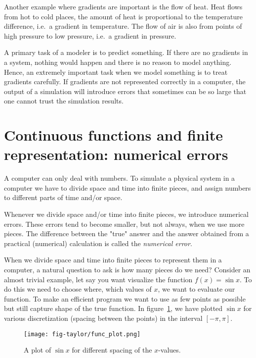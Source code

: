 \documentclass[graybox,sectrefs,envcountresetchap,open=right,final]{svmonodo}
\newenvironment{graybox2admon}[1][]{
\begin{graybox2mdframed}[frametitle=#1]
}
{
\end{graybox2mdframed}
}
\begin{document}
Another example where gradients are important is the flow of heat. Heat flows from hot to cold places, the amount of heat is proportional to the temperature difference, i.e.~a gradient in temperature. The flow of air is also from points of high pressure to low pressure, i.e.~a gradient in pressure. 

A primary task of a modeler is to predict something. If there are no gradients in a system, nothing would happen and there is no reason to model anything. Hence, an extremely important task when we model something is to treat gradients carefully. If gradients are not represented correctly in a computer, the output of a simulation will introduce errors that sometimes can be so large that one cannot trust the simulation results.

\section{Continuous functions and finite representation: numerical errors}
A computer can only deal with numbers. To simulate a physical system in a computer we have to divide space and time into finite pieces, and assign numbers to different parts of time and/or space. 



\begin{graybox2admon}[Numerical errors]
Whenever we divide space and/or time into finite pieces, we introduce numerical errors. These errors tend to become smaller, but not always, when we use more pieces. The difference between the "true" answer and the answer obtained from a practical (numerical) calculation is called the \emph{numerical error}.
\end{graybox2admon}




When we divide space and time into finite pieces to represent them in a computer, a natural question to ask is how many pieces do we need? Consider an almost trivial example, let say you want visualize the function $f(x)=\sin x$. To do this we need to choose where, which values of $x$, we want to evaluate our function. To make an efficient program we want to use as few points as possible but still capture shape of the true function.  
In figure~\ref{fig:taylor:sinx}, we have plotted $\sin x$ for various discretization (spacing between the points) in the interval $[-\pi,\pi]$.

\begin{figure}[!ht]  %
  \centerline{\texttt{[image: fig-taylor/func\_plot.png]}}
  \caption{
  A plot of $\sin x$ for different spacing of the $x$-values. \label{fig:taylor:sinx}
  }
\end{figure}
\end{document}

